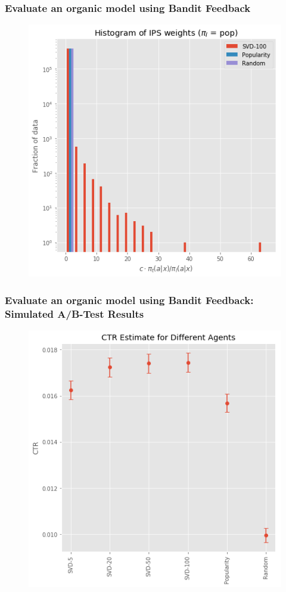 \begin{frame}
  \frametitle{Evaluate an organic model using Bandit Feedback}
\begin{figure}[h!]
\includegraphics[scale=0.4]{images/evalorganicwithbandit6.png}
\centering
\label{motex1}
\end{figure}
\end{frame}


\begin{frame}
  \frametitle{Evaluate an organic model using Bandit Feedback: Simulated A/B-Test Results}
\begin{figure}[h!]
\includegraphics[scale=0.4]{images/evalorganicwithbandit7.png}
\centering
\label{motex1}
\end{figure}
\end{frame}


